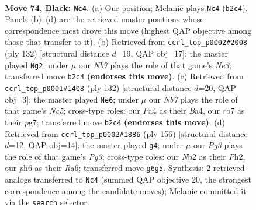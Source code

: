 \documentclass[11pt]{article}
\begin{document}
\clearpage

\begin{figure}[p]\centering
\begin{subfigure}{0.46\textwidth}\centering
\resizebox{\linewidth}{!}{%
\newchessgame
\chessboard[
  setfen={8/1R5p/6pP/2k2p2/p4P2/8/1n5K/8 b - - 0 74},
  showmover=false,
  pgfstyle=straightmove, color=movearrow, markmove={b2-c4}
]}
\caption{}
\end{subfigure}\hfill
\begin{subfigure}{0.46\textwidth}\centering
\resizebox{\linewidth}{!}{%
\newchessgame
\chessboard[
  setfen={8/6k1/7p/7P/5PP1/r3N3/5K2/8 w - - 2 67},
  showmover=false,
  pgfstyle=straightmove, color=movearrow, markmove={e3-g2}
]}
\caption{}
\end{subfigure}
\\[4pt]
\begin{subfigure}{0.46\textwidth}\centering
\resizebox{\linewidth}{!}{%
\newchessgame
\chessboard[
  setfen={8/6p1/1k6/2N1K2p/B4P1P/6P1/8/8 w - - 1 67},
  showmover=false,
  pgfstyle=straightmove, color=movearrow, markmove={c5-e6}
]}
\caption{}
\end{subfigure}\hfill
\begin{subfigure}{0.46\textwidth}\centering
\resizebox{\linewidth}{!}{%
\newchessgame
\chessboard[
  setfen={8/6k1/R7/6p1/8/6Pp/4KP1P/7r w - - 4 79},
  showmover=false,
  pgfstyle=straightmove, color=movearrow, markmove={g3-g4}
]}
\caption{}
\end{subfigure}
\caption{\textbf{Move 74, Black: \texttt{Nc4}.} (a) Our position; Melanie plays \texttt{Nc4} (\texttt{b2c4}). Panels (b)--(d) are the retrieved master positions whose correspondence most drove this move (highest QAP objective among those that transfer to it). (b) Retrieved from \texttt{ccrl\_top\_p0002\#2008} (ply 132) [structural distance $d$=19, QAP obj=17]: the master played \texttt{Ng2}; under $\mu$ our \emph{Nb7} plays the role of that game's \emph{Ne3}; transferred move \texttt{b2c4} \textbf{(endorses this move)}. (c) Retrieved from \texttt{ccrl\_top\_p0001\#1408} (ply 132) [structural distance $d$=20, QAP obj=3]: the master played \texttt{Ne6}; under $\mu$ our \emph{Nb7} plays the role of that game's \emph{Nc5}; cross-type roles: our \emph{P}a4 as their \emph{B}a4, our \emph{r}b7 as their \emph{p}g7; transferred move \texttt{b2c4} \textbf{(endorses this move)}. (d) Retrieved from \texttt{ccrl\_top\_p0002\#1886} (ply 156) [structural distance $d$=12, QAP obj=14]: the master played \texttt{g4}; under $\mu$ our \emph{Pg3} plays the role of that game's \emph{Pg3}; cross-type roles: our \emph{N}b2 as their \emph{P}h2, our \emph{p}h6 as their \emph{R}a6; transferred move \texttt{g6g5}. Synthesis: 2 retrieved analogs transferred to \texttt{Nc4} (summed QAP objective 20, the strongest correspondence among the candidate moves); Melanie committed it via the \texttt{search} selector.}
\label{fig:thought-m147}
\end{figure}
\end{document}
